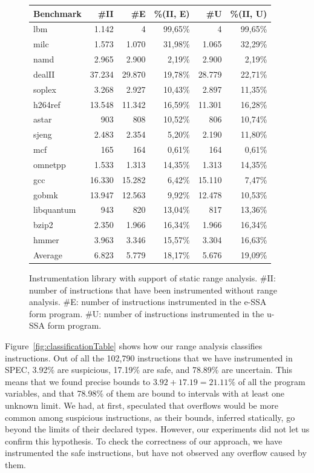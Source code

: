 \documentclass{sigplanconf}[10pt]
\begin{document}
\begin{figure}[t!]
\begin{center}
\begin{small}
\begin{tabular*}{\columnwidth}{@{\extracolsep{\fill}}|l|r|r|r|r|r|}
\hline
Benchmark & \#II & \#E & \%(II, E) & \#U &
\%(II, U) \\ \hline
lbm & 1.142 & 4 & 99,65\% & 4 & 99,65\% \\ \hline
milc & 1.573 & 1.070 & 31,98\% & 1.065 & 32,29\% \\ \hline
namd & 2.965 & 2.900 & 2,19\% & 2.900 & 2,19\% \\ \hline
dealII & 37.234 & 29.870 & 19,78\% & 28.779 & 22,71\% \\ \hline
soplex & 3.268 & 2.927 & 10,43\% & 2.897 & 11,35\% \\ \hline
h264ref & 13.548 & 11.342 & 16,59\% & 11.301 & 16,28\% \\ \hline
astar & 903 & 808 & 10,52\% & 806 & 10,74\% \\ \hline
sjeng & 2.483 & 2.354 & 5,20\% & 2.190 & 11,80\% \\ \hline
mcf & 165 & 164 & 0,61\% & 164 & 0,61\% \\ \hline
omnetpp & 1.533 & 1.313 & 14,35\% & 1.313 & 14,35\% \\ \hline
gcc & 16.330 & 15.282 & 6,42\% & 15.110 & 7,47\% \\ \hline
gobmk & 13.947 & 12.563 & 9,92\% & 12.478 & 10,53\% \\ \hline
libquantum & 943 & 820 & 13,04\% & 817 & 13,36\% \\ \hline
bzip2 & 2.350 & 1.966 & 16,34\% & 1.966 & 16,34\% \\ \hline
hmmer & 3.963 & 3.346 & 15,57\% & 3.304 & 16,63\% \\ \hline
Average & 6.823 & 5.779 & 18,17\% & 5.676 & 19,09\% \\ \hline
\end{tabular*}
\end{small}
\end{center}
\caption{\label{fig:prunningTable}
Instrumentation library with support of static range analysis.
\#II: number of instructions that have been instrumented without range
analysis.
\#E: number of instructions instrumented in the e-SSA form program.
\#U: number of instructions instrumented in the u-SSA form program.}
\end{figure}

Figure~\ref{fig:classificationTable} shows how our range analysis
classifies instructions.
Out of all the 102,790 instructions that we have instrumented in SPEC,
3.92\% are suspicious, 17.19\% are safe, and 78.89\% are uncertain.
This means that we found precise bounds to $3.92 + 17.19 = 21.11\%$ of all
the program variables, and that 78.98\% of them are bound to intervals with
at least one unknown limit.
We had, at first, speculated that overflows would be more common among
suspicious instructions, as their bounds, inferred statically, go beyond the
limits of their declared types.
However, our experiments did not let us confirm this hypothesis.
To check the correctness of our approach, we have instrumented the safe instructions,
but have not observed any overflow caused by them.
\end{document}
